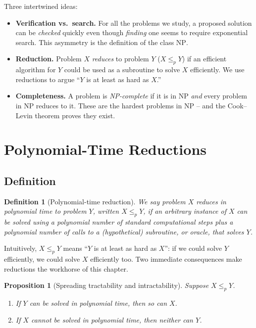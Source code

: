 \documentclass[11pt]{article}
\newtheorem{proposition}[theorem]{Proposition}
\newtheorem{definition}[theorem]{Definition}
\begin{document}
Three intertwined ideas:
\begin{itemize}
    \item \textbf{Verification vs.\ search.} For all the problems we study, a proposed
    solution can be \emph{checked} quickly even though \emph{finding} one seems to require
    exponential search. This asymmetry is the definition of the class $\mathrm{NP}$.
    \item \textbf{Reduction.} Problem $X$ \emph{reduces} to problem $Y$ ($X \le_p Y$) if an
    efficient algorithm for $Y$ could be used as a subroutine to solve $X$ efficiently. We
    use reductions to argue ``$Y$ is at least as hard as $X$.''
    \item \textbf{Completeness.} A problem is \emph{NP-complete} if it is in $\mathrm{NP}$
    \emph{and} every problem in $\mathrm{NP}$ reduces to it. These are the hardest problems
    in $\mathrm{NP}$ -- and the Cook--Levin theorem proves they exist.
\end{itemize}

\section{Polynomial-Time Reductions}

\subsection{Definition}

\begin{definition}[Polynomial-time reduction]
\label{def:reduction}
We say problem $X$ \emph{reduces in polynomial time} to problem $Y$, written
$X \le_p Y$, if an arbitrary instance of $X$ can be solved using a polynomial number of
standard computational steps \emph{plus} a polynomial number of calls to a (hypothetical)
subroutine, or \emph{oracle}, that solves $Y$.
\end{definition}

Intuitively, $X \le_p Y$ means ``$Y$ is at least as hard as $X$'': if we could solve $Y$
efficiently, we could solve $X$ efficiently too. Two immediate consequences make
reductions the workhorse of this chapter.

\begin{proposition}[Spreading tractability and intractability]
\label{prop:spread}
Suppose $X \le_p Y$.
\begin{enumerate}[label=(\alph*)]
    \item If $Y$ can be solved in polynomial time, then so can $X$.
    \item If $X$ cannot be solved in polynomial time, then neither can $Y$.
\end{enumerate}
\end{proposition}
\end{document}
